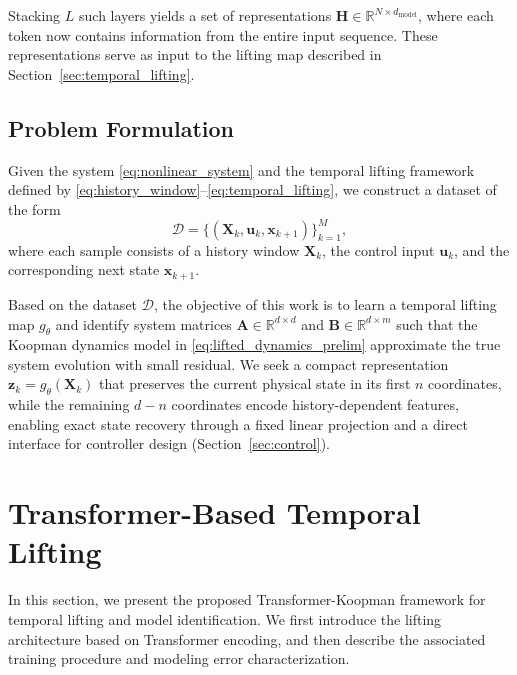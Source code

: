 \documentclass[journal]{IEEEtran}
\newcommand{\vx}{\mathbf{x}}
\newcommand{\vu}{\mathbf{u}}
\newcommand{\vz}{\mathbf{z}}
\newcommand{\mA}{\mathbf{A}}
\newcommand{\mB}{\mathbf{B}}
\newcommand{\mX}{\mathbf{X}}
\newcommand{\mH}{\mathbf{H}}
\begin{document}
Stacking $L$ such layers yields a set of representations $\mH \in \mathbb{R}^{N \times d_{\mathrm{model}}}$, where each token now contains information from the entire input sequence. These representations serve as input to the lifting map described in Section~\ref{sec:temporal_lifting}.

\subsection{Problem Formulation}
\label{sec:problem}

Given the system \eqref{eq:nonlinear_system} and the temporal lifting framework defined by \eqref{eq:history_window}--\eqref{eq:temporal_lifting}, we construct a dataset of the form
\begin{equation}
    \mathcal{D} = \{(\mX_k, \vu_k, \vx_{k+1})\}_{k=1}^{M},
    \label{eq:dataset}
\end{equation}
where each sample consists of a history window $\mX_k$, the control input $\vu_k$, and the corresponding next state $\vx_{k+1}$. 

Based on the dataset $\mathcal{D}$, the objective of this work is to learn a temporal lifting map $g_\theta$ and identify system matrices $\mA \in \mathbb{R}^{d\times d}$ and $\mB \in \mathbb{R}^{d\times m}$ such that the Koopman dynamics model in \eqref{eq:lifted_dynamics_prelim} approximate the true system evolution with small residual. We seek a compact representation $\vz_k = g_\theta(\mX_k)$ that preserves the current physical state in its first $n$ coordinates, while the remaining $d-n$ coordinates encode history-dependent features, enabling exact state recovery through a fixed linear projection and a direct interface for controller design (Section~\ref{sec:control}).

\section{Transformer-Based Temporal Lifting}
\label{sec:methodology}

In this section, we present the proposed Transformer-Koopman framework
for temporal lifting and model identification. We first introduce the
lifting architecture based on Transformer encoding, and then describe
the associated training procedure and modeling error characterization.
\end{document}
